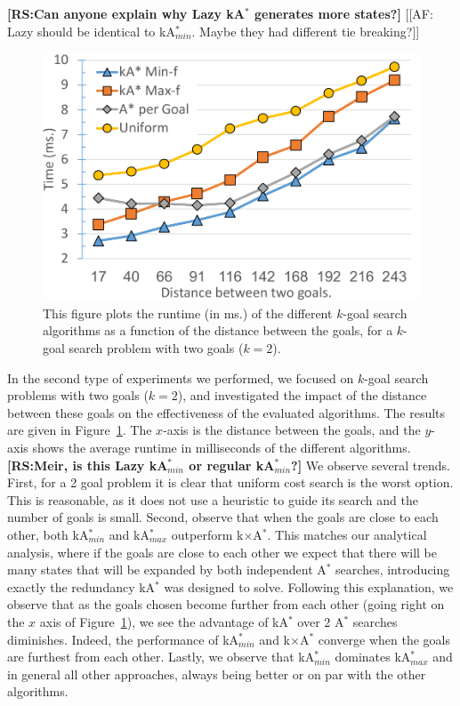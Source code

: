 \documentclass{aicom2e}
\newcommand{\kgs}{$k$-goal search}
\newcommand{\astar}{A$^*$}
\newcommand{\kastar}{kA$^*$}
\newcommand{\kastarmin}{kA$^*_{min}$}
\newcommand{\kastarmax}{kA$^*_{max}$}
\newcommand{\kxastar}{k$\times$A$^*$}
\newcommand{\roni}[1]{\textbf{[RS:#1]}}
\begin{document}
\roni{Can anyone explain why Lazy \kastar{} generates more states?}
[[AF: Lazy should be identical to \kastarmin{}. Maybe they had different tie breaking?]]




\begin{figure}
	\includegraphics[width=\columnwidth]{G0-G1_cropped.pdf}      
	\caption{This figure plots the runtime (in ms.) of the different \kgs{} algorithms as a function of the distance between the goals, for a \kgs{} problem with two goals ($k=2$).}
	\label{fig:2-goal}
\end{figure}
In the second type of experiments we performed, we focused on \kgs{} problems with two goals ($k=2$), and investigated the impact of the distance between these goals on the effectiveness of the evaluated algorithms. 
The results are given in Figure~\ref{fig:2-goal}. The $x$-axis is the distance between the goals, and the $y$-axis shows the average runtime in milliseconds of the different algorithms. 
\roni{Meir, is this Lazy \kastarmin{} or regular \kastarmin{}?} 
We observe several trends. 
First, for a 2 goal problem it is clear that uniform cost search is the worst option. 
This is reasonable, as it does not use a heuristic to guide its search and the number of goals is small. 
Second, observe that when the goals are close to each other, both \kastarmin{} 
and \kastarmax{} outperform \kxastar{}. This matches our analytical analysis, where if the goals are close to each other we expect that there will be many states that will be expanded by both independent \astar{} searches, introducing exactly the redundancy \kastar{} was designed to solve. 
Following this explanation, we observe that as the goals chosen become further from each other (going right on the $x$ axis of Figure~\ref{fig:2-goal}), we see the advantage of \kastar{} over 2 \astar{} searches diminishes. Indeed, the performance of \kastarmin{}  and \kxastar{} converge when the goals are furthest from each other. 
Lastly, we observe that \kastarmin{} dominates \kastarmax{} and in general all other approaches, always being better or on par with the other algorithms. 
\end{document}
